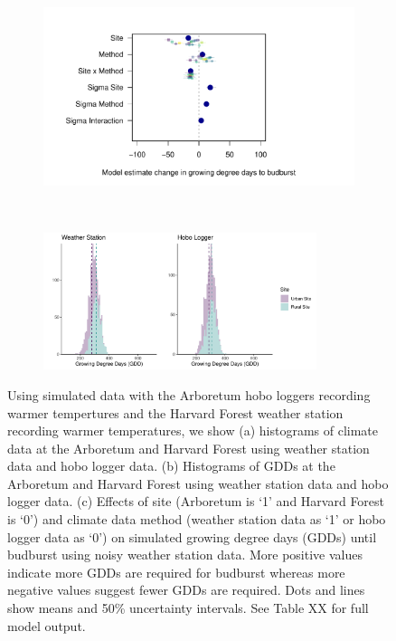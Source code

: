 \documentclass{article}\usepackage[]{graphicx}\usepackage[]{color}
\begin{document}
\begin{figure}[H]
  \begin{subfigure}{.5\linewidth}
    \caption{}
      \centering
      \includegraphics[height=7cm, width=11cm]{..//analyses/figures/muplot_urbws.pdf}
      \label{fig:muploturbanws}
  \end{subfigure}%
    \begin{subfigure}{.5\linewidth}
      \caption{}
      \centering
      \includegraphics[height=4cm, width=8cm]{..//analyses/figures/gdd_methods_urbanws.pdf}
    \label{fig:gddurbanws}
  \end{subfigure}
\caption{ Using simulated data with the Arboretum hobo loggers recording warmer tempertures and the Harvard Forest weather station recording warmer temperatures, we show (a) histograms of climate data at the Arboretum and Harvard Forest using weather station data and hobo logger data. (b) Histograms of GDDs at the Arboretum and Harvard Forest using weather station data and hobo logger data. (c) Effects of site (Arboretum is `1' and Harvard Forest is `0') and climate data method (weather station data as `1' or hobo logger data as `0') on simulated growing degree days (GDDs) until budburst using noisy weather station data. More positive values indicate more GDDs are required for budburst whereas more negative values suggest fewer GDDs are required. Dots and lines show means and 50\% uncertainty intervals. See Table XX for full model output.}
\label{fig:urbanws}
\end{figure}
\end{document}
